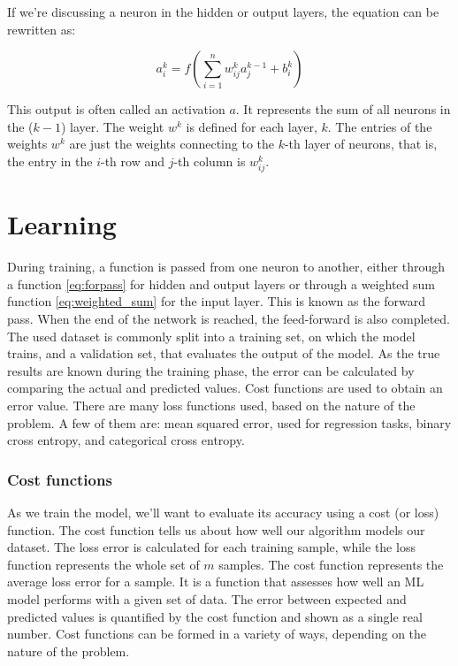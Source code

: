 If we're discussing a neuron in the hidden or output layers, the equation can be rewritten as:

\begin{equation}
	a_i^k =f\left(\sum_{i=1}^{n} w_{ij}^k a_j^{k-1} + b_i^k\right)
	\label{eq:forpasshidden}
\end{equation}

This output is often called an activation $a$. It represents the sum of all neurons in the ($k-1$) layer. The weight $w^k$ is defined for each layer, $k$. The entries of the weights $w^k$ are just the weights connecting to the $k$-th layer of neurons, that is, the entry in the $i$-th row and $j$-th column is $w^k_{ij}$.


\section{Learning}

During training, a function is passed from one neuron to another, either through a function \ref{eq:forpass} for hidden and output layers or through a weighted sum function \ref{eq:weighted_sum} for the input layer. This is known as the forward pass. When the end of the network is reached, the feed-forward is also completed.\newline
The used dataset is commonly split into a training set, on which the model trains, and a validation set, that evaluates the output of the model. 
As the true results are known during the training phase, the error can be calculated by comparing the actual and predicted values. Cost functions are used to obtain an error value.\newline
There are many loss functions used, based on the nature of the problem. A few of them are: mean squared error, used for regression tasks, binary cross entropy, and categorical cross entropy.
\subsubsection*{Cost functions}
As we train the model, we’ll want to evaluate its accuracy using a cost (or loss) function. The cost function tells us about how well our algorithm models our dataset. The loss error is calculated for each training sample, while the loss function represents the whole set of $m$ samples. The cost function represents the average loss error for a sample. It is a function that assesses how well an ML model performs with a given set of data. The error between expected and predicted values is quantified by the cost function and shown as a single real number. Cost functions can be formed in a variety of ways, depending on the nature of the problem.
